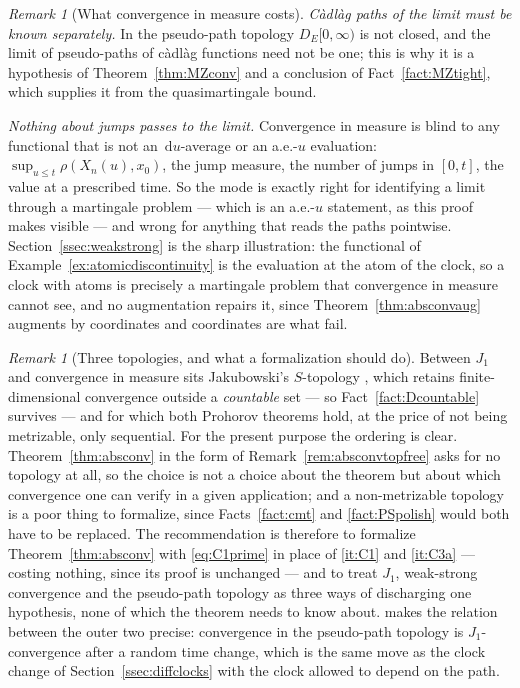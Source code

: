 \documentclass[11pt,a4paper]{article}
\theoremstyle{plain}
\theoremstyle{definition}
\theoremstyle{remark}
\newtheorem{remark}[theorem]{Remark}
\newcommand{\DE}{D_E[0,\infty)}
\newcommand{\dif}{\,\mathrm{d}}
\newcommand{\Ku}{\cite{Kurtz91}}
\begin{document}
\begin{remark}[What convergence in measure costs]
  \emph{C\`adl\`ag paths of the limit must be known separately.}  In the
  pseudo-path topology $\DE$ is not closed, and the limit of pseudo-paths of
  c\`adl\`ag functions need not be one; this is why it is a hypothesis of
  Theorem~\ref{thm:MZconv} and a conclusion of Fact~\ref{fact:MZtight}, which
  supplies it from the quasimartingale bound.

  \emph{Nothing about jumps passes to the limit.}  Convergence in measure is blind
  to any functional that is not an $\dif u$-average or an a.e.-$u$ evaluation:
  $\sup_{u \leq t} \rho(X_n(u), x_0)$, the jump measure, the number of jumps in
  $[0,t]$, the value at a prescribed time.  So the mode is exactly right for
  identifying a limit through a martingale problem --- which is an a.e.-$u$
  statement, as this proof makes visible --- and wrong for anything that reads the
  paths pointwise.  Section~\ref{ssec:weakstrong} is the sharp illustration: the
  functional of Example~\ref{ex:atomicdiscontinuity} is the evaluation at the atom
  of the clock, so a clock with atoms is precisely a martingale problem that
  convergence in measure cannot see, and no augmentation repairs it, since
  Theorem~\ref{thm:absconvaug} augments by coordinates and coordinates are what
  fail.
\end{remark}

\begin{remark}[Three topologies, and what a formalization should do]
  \label{rem:threetopologies}
  Between $J_1$ and convergence in measure sits Jakubowski's $S$-topology
  \cite{Jak97}, which retains finite-dimensional convergence outside a
  \emph{countable} set --- so Fact~\ref{fact:Dcountable} survives --- and for
  which both Prohorov theorems hold, at the price of not being metrizable, only
  sequential.  For the present purpose the ordering is clear.
  Theorem~\ref{thm:absconv} in the form of Remark~\ref{rem:absconvtopfree} asks
  for no topology at all, so the choice is not a choice about the theorem but
  about which convergence one can verify in a given application; and a
  non-metrizable topology is a poor thing to formalize, since
  Facts~\ref{fact:cmt} and \ref{fact:PSpolish} would both have to be replaced.
  The recommendation is therefore to formalize
  Theorem~\ref{thm:absconv} with \eqref{eq:C1prime} in place of \ref{it:C1} and
  \ref{it:C3a} --- costing nothing, since its proof is unchanged --- and to treat
  $J_1$, weak-strong convergence and the pseudo-path topology as three ways of
  discharging one hypothesis, none of which the theorem needs to know about.
  \Ku{} makes the relation between the outer two precise: convergence in the
  pseudo-path topology is $J_1$-convergence after a random time change, which is
  the same move as the clock change of Section~\ref{ssec:diffclocks} with the
  clock allowed to depend on the path.
\end{remark}
\end{document}
